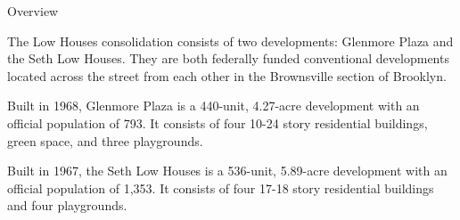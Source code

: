 Overview

The Low Houses consolidation consists of two developments: Glenmore Plaza and the Seth Low Houses. They are both federally funded conventional developments located across the street from each other in the Brownsville section of Brooklyn. 

Built in 1968, Glenmore Plaza is a 440-unit, 4.27-acre development with an official population of 793. It consists of four 10-24 story residential buildings, green space, and three playgrounds. 

Built in 1967, the Seth Low Houses is a 536-unit, 5.89-acre development with an official population of 1,353. It consists of four 17-18 story residential buildings and four playgrounds. 